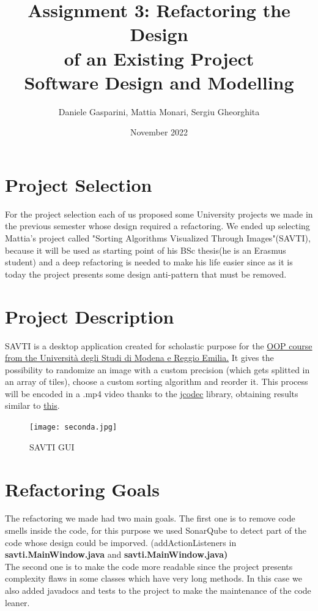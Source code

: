 \documentclass{article}
\title{Assignment 3: Refactoring the Design\\
of an Existing Project\\
\large Software Design and Modelling}
\author{Daniele Gasparini, Mattia Monari, Sergiu Gheorghita}
\date{\nth{28} November 2022}
\begin{document}
\maketitle

\section{Project Selection}
For the project selection each of us proposed some University projects we made in the previous semester whose design required a refactoring. We ended up selecting Mattia's project called "Sorting Algorithms Visualized Through Images"(SAVTI), because it will be used as starting point of his BSc thesis(he is an Erasmus student) and a deep refactoring is needed to make his life easier since as it is today the project presents some design anti-pattern that must be removed.

\section{Project Description}
SAVTI is a desktop application created for scholastic purpose for the \href{https://github.com/nbicocchi/ooprogramming}{OOP course from the Università degli Studi di Modena e Reggio Emilia.} It gives the possibility to randomize an image with a custom precision (which gets splitted in an array of tiles), choose a custom sorting algorithm and reorder it. This process will be encoded in a .mp4 video thanks to the \href{https://github.com/jcodec/jcodec}{jcodec} library, obtaining results similar to \href{https://youtu.be/4lyLJmZbQSA}{this}.
\newline 
\begin{figure} [h!]
    \centering
    \texttt{[image: seconda.jpg]} 
    \caption{SAVTI GUI} 
    \label{GUI}
\end{figure}


\section{Refactoring Goals}
The refactoring we made had two main goals. The first one is to remove code smells inside the code, for this purpose we used SonarQube to detect part of the code whose design could be imporved. 
(addActionListeners in \textbf{savti.MainWindow.java} and \textbf{savti.MainWindow.java)}\\
The second one is to make the code more readable since the project presents complexity flaws in some classes which have very long methods. In this case we also added javadocs and tests to the project to make the maintenance of the code leaner.
\end{document}

